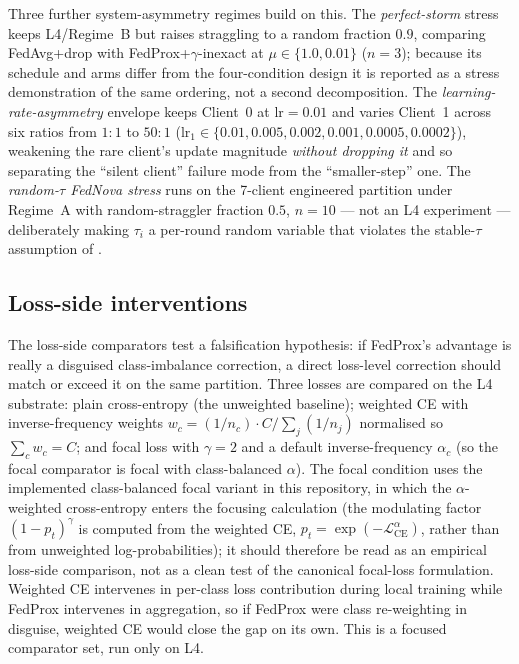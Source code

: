 \documentclass[11pt,a4paper]{report}
\begin{document}
Three further system-asymmetry regimes build on this. The \emph{perfect-storm}
stress keeps L4/Regime~B but raises straggling to a random fraction $0.9$,
comparing FedAvg+drop with FedProx+$\gamma$-inexact at $\mu \in \{1.0, 0.01\}$
($n = 3$); because its schedule and arms differ from the four-condition design it
is reported as a stress demonstration of the same ordering, not a second
decomposition. The \emph{learning-rate-asymmetry} envelope keeps Client~0 at
$\textrm{lr} = 0.01$ and varies Client~1 across six ratios from $1{:}1$ to $50{:}1$
($\textrm{lr}_1 \in \{0.01, 0.005, 0.002, 0.001, 0.0005, 0.0002\}$), weakening the
rare client's update magnitude \emph{without dropping it} and so separating the
``silent client'' failure mode from the ``smaller-step'' one. The
\emph{random-$\tau$ FedNova stress} runs on
the 7-client engineered partition under Regime~A with random-straggler fraction
$0.5$, $n = 10$ --- not an L4 experiment --- deliberately making $\tau_i$ a
per-round random variable that violates the stable-$\tau$ assumption of
\citet{wang2020fednova}.


\subsection{Loss-side interventions}
\label{sec:method-losses}

The loss-side comparators test a falsification hypothesis: if FedProx's advantage
is really a disguised class-imbalance correction, a direct loss-level correction
should match or exceed it on the same partition. Three losses are compared on the
L4 substrate: plain cross-entropy (the unweighted baseline); weighted CE with
inverse-frequency weights $w_c = (1/n_c)\cdot C / \sum_j (1/n_j)$ normalised so
$\sum_c w_c = C$; and focal loss \citep{lin2017focal} with $\gamma = 2$ and a
default inverse-frequency $\alpha_c$ (so the focal comparator is focal with
class-balanced $\alpha$). The focal condition uses the implemented class-balanced
focal variant in this repository, in which the $\alpha$-weighted cross-entropy
enters the focusing calculation (the modulating factor $(1-p_t)^{\gamma}$ is
computed from the weighted CE, $p_t=\exp(-\mathcal{L}^{\alpha}_{\mathrm{CE}})$,
rather than from unweighted log-probabilities); it should therefore be read as an
empirical loss-side comparison, not as a clean test of the canonical focal-loss
formulation. Weighted CE intervenes in per-class loss contribution
during local training while FedProx intervenes in aggregation, so if FedProx were
class re-weighting in disguise, weighted CE would close the gap on its own. This is
a focused comparator set, run only on L4.
\end{document}
